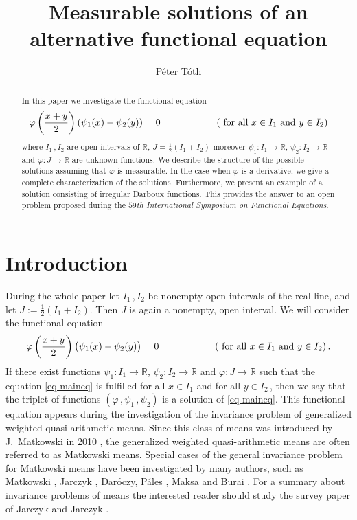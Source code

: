 \documentclass[12pt]{amsart}
\author[P\'eter T\'oth]{P\'eter T\'oth}
\title[Measurable solutions of an alternative functional equation]{Measurable solutions of an alternative functional equation}
\theoremstyle{remark}
\theoremstyle{definition}
\newcommand{\RR}{\mathbb{R}}
\newcommand{\map}{\longrightarrow}
\begin{document}
\begin{abstract}
In this paper we investigate the functional equation 
\[ 
\varphi \left( \frac{x+y}{2} \right) 
\left( \psi_1(x) - \psi_2(y) \right) = 0 
\hspace{20mm} 
\left( \mbox{ for all } 
x \in I_1 \mbox{ and } y \in I_2 \right) 
\] 
where $ I_1 \,, I_2 $ are open intervals of $ \RR $, 
$ J = \frac{1}{2} \left( I_1 + I_2 \right) $ moreover 
$ \psi_1 : I_1 \rightarrow \RR $, 
$ \psi_2 : I_2 \rightarrow \RR $ and 
$ \varphi : J \rightarrow \RR $ 
are unknown functions. 
We describe the structure of the possible solutions 
assuming that $ \varphi $ is measurable. 
In the case when $ \varphi $ is a derivative, we 
give a complete characterization of the solutions. 
Furthermore, we present an example of a solution 
consisting of irregular Darboux functions. 
This provides the answer to an open problem 
proposed during the 
{\em $59$th International Symposium on Functional Equations}. 
\end{abstract}

\maketitle

\section{Introduction} 
During the whole paper let 
$ I_1 \,, I_2 $ be 
nonempty open intervals of the real line, and let 
$ J := \frac{1}{2} \left( I_1 + I_2 \right) $. 
Then $ J $ is again a nonempty, open interval. 
We will consider the functional equation 
\begin{equation}\label{eq-maineq} 
\varphi \left( \frac{x+y}{2} \right) 
\bigl( \psi_1(x) - \psi_2(y) \bigr) = 0 
\hspace{20mm} 
\left( \mbox{ for all } 
x \in I_1 \mbox{ and } y \in I_2 \right). 
\end{equation} 
If there exist functions 
$ \psi_1 : I_1 \map \RR $, 
$ \psi_2 : I_2 \map \RR $ and 
$ \varphi : J \map \RR $ 
such that the equation \eqref{eq-maineq}
is fulfilled for all 
$ x \in I_1 $ and for all $ y \in I_2 \, $, then 
we say that the triplet of functions 
$ \left( \varphi \,, \psi_1 \,, \psi_2 \right) $ 
is a solution of \eqref{eq-maineq}. 
This functional equation appears during the investigation 
of the invariance problem of 
generalized weighted quasi-arithmetic means. 
Since this class of means was introduced by 
J.~Matkowski in 2010 \cite{Mat10}, the 
generalized weighted quasi-arithmetic means are often referred to 
as Matkowski means. 
Special cases of the general invariance problem 
for Matkowski means have been investigated by many 
authors, such as Matkowski \cite{Mat99}, 
Jarczyk \cite{JM06, Jar07}, 
Daróczy, Páles \cite{DP01, DP02}, 
Maksa \cite{DMP00} and 
Burai \cite{Bur06, Bur07}. 
For a summary about invariance problems 
of means the interested reader 
should study the survey paper of 
Jarczyk and Jarczyk \cite{JJ18}. 
\end{document}
